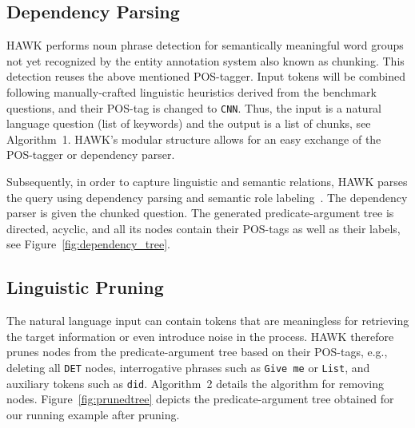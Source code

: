 \subsection{Dependency Parsing}
HAWK performs noun phrase detection for semantically meaningful word groups not yet recognized by the entity annotation system also known as chunking.
This detection reuses the above mentioned POS-tagger. %
Input tokens will be combined following manually-crafted linguistic heuristics derived from the benchmark questions, and their POS-tag is changed to \texttt{CNN}.
Thus, the input is a natural language question (list of keywords) and the output is a list of chunks, see Algorithm~1.
HAWK's modular structure allows for an easy exchange of the POS-tagger or dependency parser.



Subsequently, in order to capture linguistic and semantic relations, HAWK parses the query using dependency parsing and semantic role labeling~\cite{choi2011getting}.
The dependency parser is given the chunked question. 
The generated pre\-dicate-argument tree is directed, acyclic, and all its nodes contain their POS-tags as well as their labels, see Figure~\ref{fig:dependency_tree}.


\subsection{Linguistic Pruning}

The natural language input can contain tokens that are meaningless for retrieving the target information or even introduce noise in the process.
HAWK therefore prunes nodes from the predicate-argument tree based on their POS-tags, e.g., deleting all \texttt{DET} nodes, interrogative phrases such as \texttt{Give me} or \texttt{List}, and auxiliary tokens such as \texttt{did}.
Algorithm~2 details the algorithm for removing nodes.
Figure~\ref{fig:prunedtree} depicts the predicate-argument tree obtained for our running example after pruning.%



